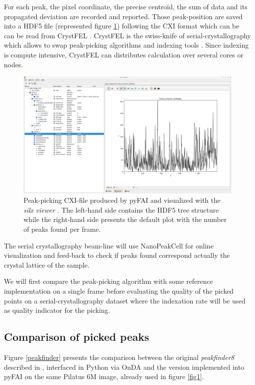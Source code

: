 \documentclass[preprint]{iucr}              %
\begin{document}
For each peak, the pixel coordinate, the precise centroïd, the sum of data and its propagated deviation are recorded and reported. 
Those peak-position are saved into a HDF5 file (represented figure \ref{silx}) following the CXI format \cite{cxi} which can be can be read from CrystFEL \cite{CrystFEL}.
CrystFEL is the swiss-knife of serial-crystallography which allows to swap peak-picking algorithms \cite{zaefferer, Cheetah2014, robustpeakfinder} and indexing tools \cite{xds, mosflm, taketwo, xgandalf, pinkindexer}.
Since indexing is compute intensive, CrystFEL can distributes calculation over several cores or nodes.

\begin{figure}
\label{silx}
\includegraphics[width=12cm]{silx_view}
\caption{Peak-picking CXI-file produced by pyFAI and visualized with the \textit{silx viewer} \cite{silx}.
The left-hand side contains the HDF5 tree structure while the right-hand side presents the default plot with the number of peaks found per frame.}
\end{figure}


The serial crystallography beam-line will use NanoPeakCell \cite{nanopeakcell} for online visualization and feed-back to check if peaks found correspond actually the crystal lattice of the sample.

We will first compare the peak-picking algorithm with some reference implementation on a single frame before
evaluating the quality of the picked points on a serial-crystallography dataset where the indexation rate will be used as quality indicator for the picking.

\subsection{Comparison of picked peaks}
Figure \ref{peakfinder} presents the comparison between the original \textit{peakfinder8} described in , interfaced in Python via OnDA \cite{onda} and the version implemented into pyFAI on the same Pilatus 6M image, already used in figure \ref{fig1}. 
\end{document}
